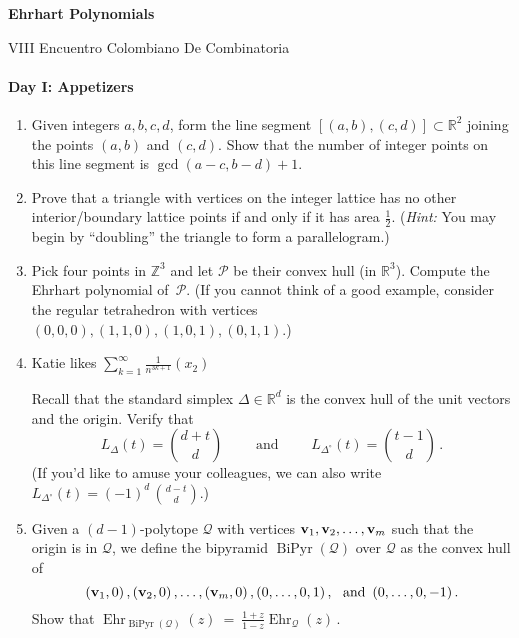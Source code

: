 \documentclass[11pt]{article}
\def\cP{\mathcal{P}}
\def\RR{\mathbb{R}}
\def\ZZ{\mathbb{Z}}
\begin{document}
\setlength{\parindent}{0pt}
\setlength{\parskip}{0.4cm}

\pagestyle{empty}

\begin{center}
\Large{\bf Ehrhart Polynomials} 

\normalsize
VIII Encuentro Colombiano De Combinatoria
\end{center}

\paragraph{Day I: Appetizers}

\begin{enumerate}[(1)]
\vspace{-10pt}

\item Given integers
$a,b,c,d$, form the line segment $[(a,b), (c,d)] \subset \RR^2$ joining the points
$(a,b)$ and $(c,d)$. Show that the number of integer points on this line segment is $\gcd(a-c,b-d)+1$.

\item Prove that a triangle with vertices on the integer lattice has no other interior/boundary lattice points if and only if it has area $\frac 1 2$.
(\emph{Hint:} You may begin by ``doubling'' the triangle to form a parallelogram.)

\item Pick four points in $\ZZ^3$ and let $\cP$ be their convex hull (in $\RR^3$). Compute the Ehrhart polynomial of~$\cP$.
(If you cannot think of a good example, consider the regular tetrahedron with vertices $\left( 0,0,0 \right) , \left( 1,1,0 \right)
, \left( 1,0,1 \right) , \left( 0,1,1 \right)$.)

\item 
Katie likes $\sum_{ k=1 }^{ \infty } \frac{ 1 }{ n^{ 3k+1 }  } \left( x_{ 2 }  \right)
$

Recall that the standard simplex $\Delta \in \RR^d$ is the convex hull of
the unit vectors and the origin. Verify that
\[ L_\Delta(t) = \binom{d+t} d \qquad \text{ and } \qquad L_{ \Delta^\circ }(t)
= \binom{t-1} d \, . \]
(If you'd like to amuse your colleagues, we can also write $L_{ \Delta^\circ
}(t) = (-1)^d \, \binom{d-t} d$.)

\def\Q{\mathcal Q}
\newcommand\DouPyr{\operatorname{BiPyr}} 
\def\v{{\bf v}}
\newcommand\Ehr{\operatorname{Ehr}} 

\item Given a $(d-1)$-polytope $\Q$ with vertices $\v_1, \v_2, \dots, \v_m$
such that the origin is in $\Q$, we define the bipyramid $\DouPyr(\Q)$ over
$\Q$ as the convex hull of
\[
\left( \v_1, 0 \right) , \left( \v_2, 0 \right) , \dots, \left( \v_m, 0 \right) , \left( 0, \dots, 0, 1 \right) , \ \text{ and } \left( 0, \dots, 0, -1 \right) .
\]
Show that
$ \displaystyle
\Ehr_{ \DouPyr (\Q) } (z) \ = \ \frac{ 1+z }{ 1-z } \Ehr_\Q (z) \, .
$


\end{enumerate}
\end{document}
